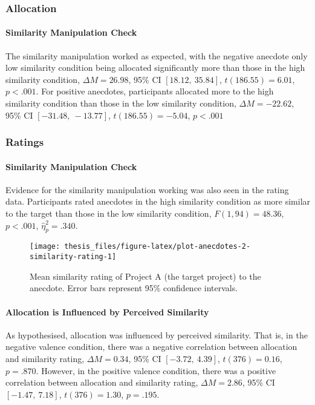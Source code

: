 \documentclass[a4paper, nobind]{templates/ociamthesis}
\theoremstyle{definition}
\theoremstyle{definition}
\theoremstyle{definition}
\theoremstyle{definition}
\theoremstyle{remark}
\begin{document}
\subsubsection{Allocation}

\paragraph{Similarity Manipulation Check}

The similarity manipulation worked as expected, with the negative anecdote only
low similarity condition being allocated significantly more than those in the
high similarity condition,
\(\Delta M = 26.98\), 95\% CI \([18.12,~35.84]\), \(t(186.55) = 6.01\), \(p < .001\). For positive
anecdotes, participants allocated more to the high similarity condition than
those in the low similarity condition,
\(\Delta M = -22.62\), 95\% CI \([-31.48,~-13.77]\), \(t(186.55) = -5.04\), \(p < .001\)

\subsubsection{Ratings}

\paragraph{Similarity Manipulation Check}

Evidence for the similarity manipulation working was also seen in the rating
data. Participants rated anecdotes in the high similarity condition as more
similar to the target than those in the low similarity condition,
\(F(1, 94) = 48.36\), \(p < .001\), \(\hat{\eta}^2_p = .340\).



\begin{figure}
\texttt{[image: thesis\_files/figure-latex/plot-anecdotes-2-similarity-rating-1]} \caption{Mean similarity rating of Project A (the target project) to the anecdote. Error bars represent 95\% confidence intervals.}\label{fig:plot-anecdotes-2-similarity-rating}
\end{figure}

\paragraph{Allocation is Influenced by Perceived Similarity}

As hypothesised, allocation was influenced by perceived similarity. That is, in
the negative valence condition, there was a negative correlation between
allocation and similarity rating,
\(\Delta M = 0.34\), 95\% CI \([-3.72,~4.39]\), \(t(376) = 0.16\), \(p = .870\).
However, in the positive valence condition,
there was a positive correlation between allocation and similarity rating,
\(\Delta M = 2.86\), 95\% CI \([-1.47,~7.18]\), \(t(376) = 1.30\), \(p = .195\).
\end{document}
